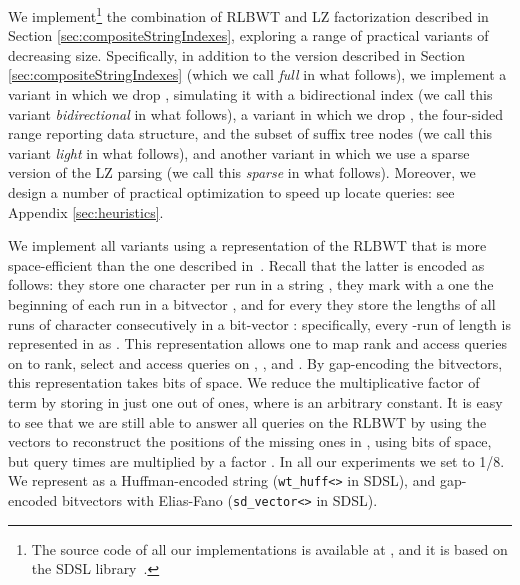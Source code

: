 \documentclass[a4paper,UKenglish]{lipics-v2016}
\begin{document}
We implement\footnote{The source code of all our implementations is available at \cite{githubNicola1,githubNicola2}, and it is based on the SDSL library~\cite{gbmp2014sea}.} the combination of RLBWT and LZ factorization described in Section \ref{sec:compositeStringIndexes}, exploring a range of practical variants of decreasing size. Specifically, in addition to the version described in Section \ref{sec:compositeStringIndexes} (which we call \emph{full} in what follows), we implement a variant in which we drop , simulating it with a bidirectional index (we call this variant \emph{bidirectional} in what follows), a variant in which we drop , the four-sided range reporting data structure, and the subset of suffix tree nodes (we call this variant \emph{light} in what follows), and another variant in which we use a sparse version of the LZ parsing (we call this \emph{sparse} in what follows). Moreover, we design a number of practical optimization to speed up locate queries: see Appendix \ref{sec:heuristics}.

We implement all variants using a representation of the RLBWT that is more space-efficient than the one described in~\cite{SirenVMN08}. Recall that the latter is encoded as follows: they store one character per run in a string , they mark with a one the beginning of each run in a bitvector , and for every  they store the lengths of all runs of character  consecutively in a bit-vector : specifically, every -run of length  is represented in  as . 
This representation allows one to map rank and access queries on  to rank, select and access queries on , , and . By gap-encoding the bitvectors, this representation takes  bits of space. We reduce the multiplicative factor of term  by storing in  just one out of  ones, where  is an arbitrary constant. It is easy to see that we are still able to answer all queries on the RLBWT by using the vectors  to reconstruct the positions of the missing ones in , using  bits of space, but query times are multiplied by a factor . In all our experiments we set  to 1/8. We represent  as a Huffman-encoded string (\texttt{wt\_huff<>} in SDSL), and gap-encoded bitvectors with Elias-Fano (\texttt{sd\_vector<>} in SDSL).
\end{document}
